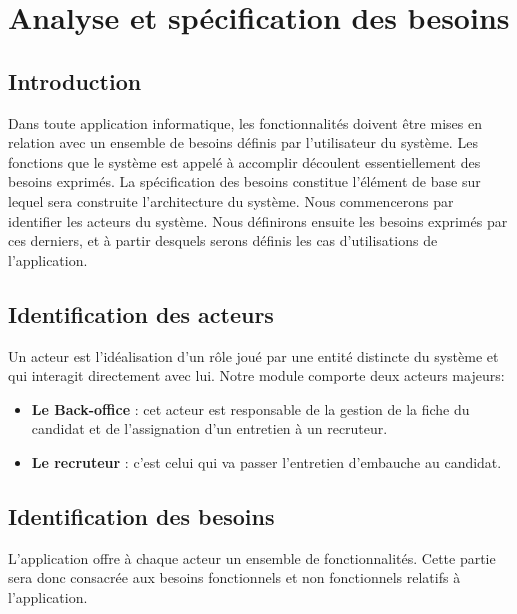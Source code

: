 \chapter{Analyse et spécification des besoins}

\section*{Introduction}
Dans toute application informatique, les fonctionnalités doivent être mises en relation avec un ensemble de besoins définis par l'utilisateur du système. Les fonctions que le système est appelé à accomplir découlent essentiellement des besoins exprimés. La spécification des besoins constitue l'élément de base sur lequel sera construite l’architecture du système. Nous commencerons par identifier les acteurs du système. Nous définirons ensuite les besoins exprimés par ces derniers, et à partir desquels serons définis les cas d’utilisations de l'application.
\section{Identification des acteurs}
Un acteur est l'idéalisation d'un rôle joué par une entité distincte du système et qui interagit directement avec lui. Notre module comporte deux acteurs majeurs:
 \begin{itemize} 
    \item  \textbf{ Le Back-office} : cet acteur est responsable de la gestion de la fiche du candidat et de l'assignation d'un entretien à un recruteur.
    \item  \textbf{Le recruteur} : c'est celui qui va passer l'entretien d'embauche au candidat.
 \end{itemize}
\section{Identification des besoins}
L’application offre à chaque acteur un ensemble de fonctionnalités. Cette partie sera donc consacrée aux besoins fonctionnels et non fonctionnels relatifs à l’application.

